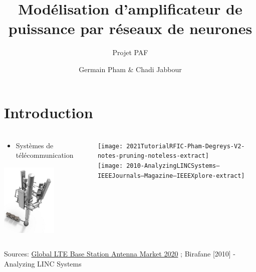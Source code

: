 \documentclass[aspectratio=169]{beamer}
\title[MAPRENE-XXI]{Modélisation d'amplificateur de puissance par réseaux de neurones}
\subtitle{Projet PAF}
\author{Germain Pham \& Chadi Jabbour}
\institute{C2S - Télécom Paris}
\date[2020-06-21]{\DTMdate{2020-06-21}}%
\begin{document}
\maketitle

\section{Introduction}

\begin{frame}
  \frametitle{\insertsection}

      \begin{columns}
        \begin{column}{0.5\textwidth}
          \footnotesize
          \begin{itemize}
            \item Systèmes de télécommunication
          \end{itemize}
          \vspace{-\baselineskip}
          \begin{center}
            \includegraphics[width=0.6\textwidth]{medium}
          \end{center}
        \end{column}
        \begin{column}{0.7\textwidth}
          \begin{center}
            \texttt{[image: 2021TutorialRFIC-Pham-Degreys-V2-notes-pruning-noteless-extract]}\\
          \vspace{0.5\baselineskip}
          \texttt{[image: 2010-AnalyzingLINCSystems--IEEEJournals--Magazine--IEEEXplore-extract]}
          \end{center}
        \end{column}
      \end{columns}

{\tiny \vspace{0.5\baselineskip}
  Sources: \href{https://manometcurrent.com/global-lte-base-station-antenna-market-2020-industry-scenario-strategies-growth-factors-and-forecast-2025/}
{Global LTE Base Station Antenna Market 2020} ; Birafane [2010] - Analyzing LINC Systems}

\end{frame}
\end{document}
